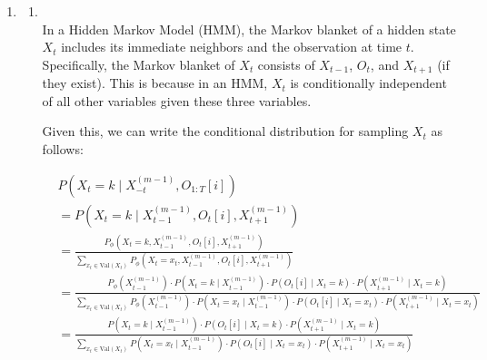 \documentclass[a4 paper]{article}
\begin{document}
\begin{enumerate}
    \item {}
    
    \begin{enumerate}
        \item {} \\

        In a Hidden Markov Model (HMM), the Markov blanket of a hidden state $X_t$ includes its immediate neighbors and the observation at time $t$. Specifically, the Markov blanket of $X_t$ consists of $X_{t-1}$, $O_t$, and $X_{t+1}$ (if they exist). This is because in an HMM, $X_t$ is conditionally independent of all other variables given these three variables. 

        Given this, we can write the conditional distribution for sampling $X_t$ as follows:

        \begin{align*}
            &P(X_t = k \mid X_{-t}^{(m-1)}, O_{1:T}[i]) \\
            &= P(X_t = k \mid X_{t-1}^{(m-1)}, O_t[i], X_{t+1}^{(m-1)}) \\
            &= \frac{P_\phi(X_t = k, X_{t-1}^{(m-1)}, O_t[i], X_{t+1}^{(m-1)})}{\sum_{x_t \in \text{Val}(X_t)} P_\phi(X_t = x_t, X_{t-1}^{(m-1)}, O_t[i], X_{t+1}^{(m-1)})} \\
            &= \frac{P_\phi(X_{t-1}^{(m-1)}) \cdot P(X_t = k \mid X_{t-1}^{(m-1)}) \cdot P(O_t[i] \mid X_t = k) \cdot P(X_{t+1}^{(m-1)} \mid X_t = k)}{\sum_{x_t \in \text{Val}(X_t)} P_\phi(X_{t-1}^{(m-1)}) \cdot P(X_t = x_t \mid X_{t-1}^{(m-1)}) \cdot P(O_t[i] \mid X_t = x_t) \cdot P(X_{t+1}^{(m-1)} \mid X_t = x_t)} \\
            &= \frac{P(X_t = k \mid X_{t-1}^{(m-1)}) \cdot P(O_t[i] \mid X_t = k) \cdot P(X_{t+1}^{(m-1)} \mid X_t = k)}{\sum_{x_t \in \text{Val}(X_t)} P(X_t = x_t \mid X_{t-1}^{(m-1)}) \cdot P(O_t[i] \mid X_t = x_t) \cdot P(X_{t+1}^{(m-1)} \mid X_t = x_t)}
        \end{align*}


\end{enumerate}
\end{enumerate}
\end{document}
